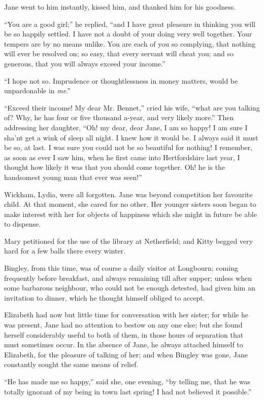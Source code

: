 Jane went to him instantly, kissed him, and thanked
him for his goodness.

“You are a good girl;” he replied, “and I have great
pleasure in thinking you will be so happily settled. I have
not a doubt of your doing very well together. Your
tempers are by no means unlike. You are each of you so
complying, that nothing will ever be resolved on; so
easy, that every servant will cheat you; and so generous,
that you will always exceed your income.”

“I hope not so. Imprudence or thoughtlessness in
money matters, would be unpardonable in \textit{me}.”

“Exceed their income! My dear Mr. Bennet,” cried
his wife, “what are you talking of? Why, he has four
or five thousand a-year, and very likely more.” Then
addressing her daughter, “Oh! my dear, dear Jane, I am
so happy! I am sure I sha’nt get a wink of sleep all night.
I knew how it would be. I always said it must be so,
at last. I was sure you could not be so beautiful for
nothing! I remember, as soon as ever I saw him, when
he first came into Hertfordshire last year, I thought how
likely it was that you should come together. Oh! he is
the handsomest young man that ever was seen!”

Wickham, Lydia, were all forgotten. Jane was beyond
competition her favourite child. At that moment, she
cared for no other. Her younger sisters soon began to
make interest with her for objects of happiness which she
might in future be able to dispense.

Mary petitioned for the use of the library at Netherfield;
and Kitty begged very hard for a few balls there every
winter.

Bingley, from this time, was of course a daily visitor
at Longbourn; coming frequently before breakfast, and
always remaining till after supper; unless when some
barbarous neighbour, who could not be enough detested,
had given him an invitation to dinner, which he thought
himself obliged to accept.

Elizabeth had now but little time for conversation with
her sister; for while he was present, Jane had no attention
to bestow on any one else; but she found herself considerably
useful to both of them, in those hours of separation
that must sometimes occur. In the absence of Jane,
he always attached himself to Elizabeth, for the pleasure
of talking of her; and when Bingley was gone, Jane
constantly sought the same means of relief.

“He has made me so happy,” said she, one evening,
“by telling me, that he was totally ignorant of my
being in town last spring! I had not believed it
possible.”

